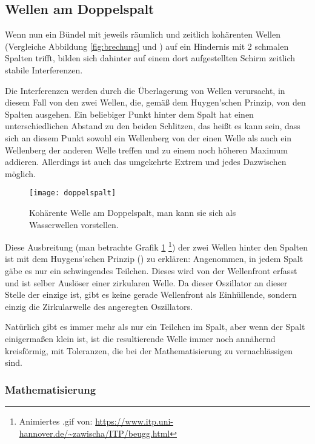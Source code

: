 \subsection{Wellen am Doppelspalt} \label{subsec:doppelspalt}

Wenn nun ein Bündel mit jeweils räumlich und zeitlich kohärenten Wellen (Vergleiche Abbildung \ref{fig:brechung} und ) auf ein Hindernis mit 2 schmalen Spalten trifft, bilden sich dahinter auf einem dort aufgestellten Schirm zeitlich stabile Interferenzen.

Die Interferenzen werden durch die Überlagerung von Wellen verursacht, in diesem Fall von den zwei Wellen, die, gemäß dem Huygen'schen Prinzip, von den Spalten ausgehen. Ein beliebiger Punkt hinter dem Spalt hat einen unterschiedlichen Abstand zu den beiden Schlitzen, das heißt es kann sein, dass sich an diesem Punkt sowohl ein Wellenberg von der einen Welle als auch ein Wellenberg der anderen Welle treffen und zu einem noch höheren Maximum addieren. Allerdings ist auch das umgekehrte Extrem und jedes Dazwischen möglich.

\begin{figure}[!h]
	\center
	\texttt{[image: doppelspalt]}
	\caption{Kohärente Welle am Doppelspalt, man kann sie sich als Wasserwellen vorstellen.}
	\label{fig:doppelspaltwasser}
\end{figure}

Diese Ausbreitung (man betrachte Grafik \ref{fig:doppelspaltwasser} \footnote{Animiertes .gif von: \url{https://www.itp.uni-hannover.de/~zawischa/ITP/beugg.html}}) der zwei Wellen hinter den Spalten ist mit dem Huygens'schen Prinzip () zu erklären: Angenommen, in jedem Spalt gäbe es nur ein schwingendes Teilchen. Dieses wird von der Wellenfront erfasst und ist selber Auslöser einer zirkularen Welle. Da dieser Oszillator an dieser Stelle der einzige ist, gibt es keine gerade Wellenfront als Einhüllende, sondern einzig die Zirkularwelle des angeregten Oszillators.

Natürlich gibt es immer mehr als nur ein Teilchen im Spalt, aber wenn der Spalt einigermaßen klein ist, ist die resultierende Welle immer noch annähernd kreisförmig, mit Toleranzen, die bei der Mathematisierung zu vernachlässigen sind.


\subsubsection{Mathematisierung}

